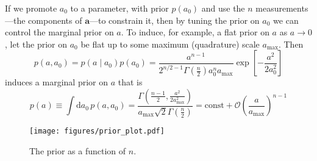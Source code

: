 \documentclass[modern]{aastex631}
\begin{document}
If we promote $a_0$ to a parameter, with prior $p\left( a_0 \right)$ and use the
$n$ measurements---the components of $\mathbf{a}$---to constrain it, then by
tuning the prior on $a_0$ we can control the marginal prior on $a$.  To induce,
for example, a flat prior on $a$ as $a \to 0$, let the prior on $a_0$ be flat up
to some maximum (quadrature) scale $a_\mathrm{max}$.  Then 
\begin{equation}
    p\left( a, a_0 \right) = p\left( a \mid a_0 \right) p\left( a_0 \right) = \frac{a^{n-1}}{2^{n/2-1} \Gamma\left(\frac{n}{2} \right) a_0^n a_\mathrm{max}} \exp\left[ -\frac{a^2}{2 a_0^2} \right]
\end{equation}
induces a marginal prior on $a$ that is 
\begin{equation}
    p\left( a \right) \equiv \int \mathrm{d} a_0 \, p\left( a, a_0 \right) = \frac{\Gamma\left( \frac{n - 1}{2}, \frac{a^2}{2 a_\mathrm{max}^2} \right)}{a_\mathrm{max} \sqrt{2} \Gamma\left( \frac{n}{2} \right)} = \mathrm{const} + \mathcal{O}\left( \frac{a}{a_\mathrm{max}} \right)^{n-1}
\end{equation}

\begin{figure}
    \texttt{[image: figures/prior\_plot.pdf]}
    \caption{The prior as a function of $n$.}
    \label{fig:prior}
\end{figure}


\end{document}
